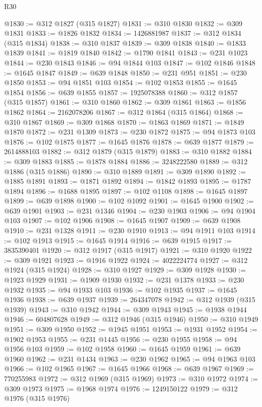 \begin{lexlean}{R30}
\begin{coremodule}
@1830 := @312 @1827 (@315 @1827)
@1831 := @310 @1830
@1832 := @309 @1831
@1833 := @1826 @1832
@1834 := 1426881987
@1837 := @312 @1834 (@315 @1834)
@1838 := @310 @1837
@1839 := @309 @1838
@1840 := @1833 @1839
@1841 := @1819 @1840
@1842 := @1790 @1841
@1843 := @231 @1023
@1844 := @230 @1843
@1846 := @94 @1844 @103
@1847 := @102 @1846
@1848 := @1645 @1847
@1849 := @639 @1848
@1850 := @231 @951
@1851 := @230 @1850
@1853 := @94 @1851 @103
@1854 := @102 @1853
@1855 := @1645 @1854
@1856 := @639 @1855
@1857 := 1925078388
@1860 := @312 @1857 (@315 @1857)
@1861 := @310 @1860
@1862 := @309 @1861
@1863 := @1856 @1862
@1864 := 2162078206
@1867 := @312 @1864 (@315 @1864)
@1868 := @310 @1867
@1869 := @309 @1868
@1870 := @1863 @1869
@1871 := @1849 @1870
@1872 := @231 @1309
@1873 := @230 @1872
@1875 := @94 @1873 @103
@1876 := @102 @1875
@1877 := @1645 @1876
@1878 := @639 @1877
@1879 := 2614888103
@1882 := @312 @1879 (@315 @1879)
@1883 := @310 @1882
@1884 := @309 @1883
@1885 := @1878 @1884
@1886 := 3248222580
@1889 := @312 @1886 (@315 @1886)
@1890 := @310 @1889
@1891 := @309 @1890
@1892 := @1885 @1891
@1893 := @1871 @1892
@1894 := @1842 @1893
@1895 := @1787 @1894
@1896 := @1688 @1895
@1897 := @102 @1108
@1898 := @1645 @1897
@1899 := @639 @1898
@1900 := @102 @1092
@1901 := @1645 @1900
@1902 := @639 @1901
@1903 := @231 @1346
@1904 := @230 @1903
@1906 := @94 @1904 @103
@1907 := @102 @1906
@1908 := @1645 @1907
@1909 := @639 @1908
@1910 := @231 @1328
@1911 := @230 @1910
@1913 := @94 @1911 @103
@1914 := @102 @1913
@1915 := @1645 @1914
@1916 := @639 @1915
@1917 := 3835390401
@1920 := @312 @1917 (@315 @1917)
@1921 := @310 @1920
@1922 := @309 @1921
@1923 := @1916 @1922
@1924 := 4022224774
@1927 := @312 @1924 (@315 @1924)
@1928 := @310 @1927
@1929 := @309 @1928
@1930 := @1923 @1929
@1931 := @1909 @1930
@1932 := @231 @1378
@1933 := @230 @1932
@1935 := @94 @1933 @103
@1936 := @102 @1935
@1937 := @1645 @1936
@1938 := @639 @1937
@1939 := 264347078
@1942 := @312 @1939 (@315 @1939)
@1943 := @310 @1942
@1944 := @309 @1943
@1945 := @1938 @1944
@1946 := 604807628
@1949 := @312 @1946 (@315 @1946)
@1950 := @310 @1949
@1951 := @309 @1950
@1952 := @1945 @1951
@1953 := @1931 @1952
@1954 := @1902 @1953
@1955 := @231 @1445
@1956 := @230 @1955
@1958 := @94 @1956 @103
@1959 := @102 @1958
@1960 := @1645 @1959
@1961 := @639 @1960
@1962 := @231 @1434
@1963 := @230 @1962
@1965 := @94 @1963 @103
@1966 := @102 @1965
@1967 := @1645 @1966
@1968 := @639 @1967
@1969 := 770255983
@1972 := @312 @1969 (@315 @1969)
@1973 := @310 @1972
@1974 := @309 @1973
@1975 := @1968 @1974
@1976 := 1249150122
@1979 := @312 @1976 (@315 @1976)

\end{coremodule}
\end{lexlean}
